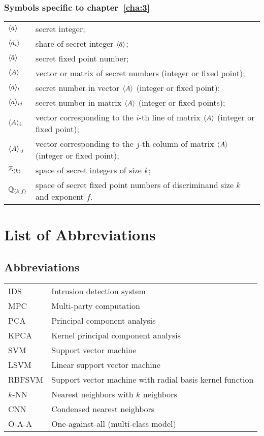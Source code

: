   \subsection*{Symbols specific to chapter~\ref{cha:3}}
  \begin{flushleft}
  \begin{tabularx}{\textwidth}{@{}p{12mm}X@{}}
    $\langle \bar{a} \rangle$ & secret integer; \\
    $\langle \bar{a_i} \rangle$ & share of secret integer $\langle \bar{a} \rangle$; \\
    $\langle \tilde{a} \rangle$ & secret fixed point number; \\
    $\langle A \rangle$ & vector or matrix of secret numbers (integer or fixed point); \\
    $\langle a \rangle_{i}$ & secret number in vector $ \langle A \rangle$ (integer or fixed point); \\
    $\langle a \rangle_{ij}$ & secret number in matrix $ \langle A \rangle$ (integer or fixed points); \\
    $\langle A \rangle_{i:}$ & vector corresponding to the $i$-th line of matrix $\langle A \rangle$ (integer or fixed point); \\
    $\langle A \rangle_{:j}$ & vector corresponding to the $j$-th column of matrix $\langle A \rangle$ (integer or fixed point); \\
    $\mathbb{Z}_{\langle k \rangle}$ & space of secret integers of size $k$; \\
    $\mathbb{Q}_{\langle k,f \rangle}$ & space of secret fixed point numbers of discriminand size $k$ and exponent $f$. \\
  \end{tabularx}
  \end{flushleft}


\chapter{List of Abbreviations}
\section*{Abbreviations}
\begin{flushleft}
  \renewcommand{\arraystretch}{1.1}
  \begin{tabularx}{\textwidth}{@{}p{17mm}X@{}}
    IDS & Intrusion detection system \\
    MPC & Multi-party computation \\
    PCA & Principal component analysis \\
    KPCA & Kernel principal component analysis \\
    SVM & Support vector machine \\
    LSVM & Linear support vector machine \\
    RBFSVM & Support vector machine with radial basis kernel function \\
    $k$-NN & Nearest neighbors with $k$ neighbors \\
    CNN & Condensed nearest neighbors \\
    O-A-A & One-against-all (multi-class model)
  \end{tabularx}
\end{flushleft}